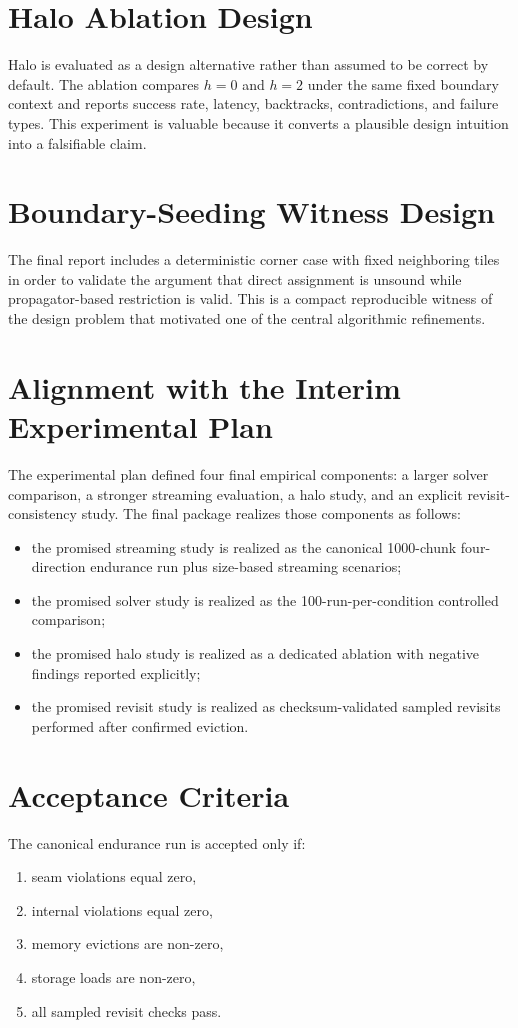 \documentclass[12pt,a4paper]{report}
\begin{document}
\section{Halo Ablation Design}
Halo is evaluated as a design alternative rather than assumed to be correct by default. The ablation compares $h=0$ and $h=2$ under the same fixed boundary context and reports success rate, latency, backtracks, contradictions, and failure types. This experiment is valuable because it converts a plausible design intuition into a falsifiable claim.

\section{Boundary-Seeding Witness Design}
The final report includes a deterministic corner case with fixed neighboring tiles in order to validate the argument that direct assignment is unsound while propagator-based restriction is valid. This is a compact reproducible witness of the design problem that motivated one of the central algorithmic refinements.

\section{Alignment with the Interim Experimental Plan}
The experimental plan defined four final empirical components: a larger solver comparison, a stronger streaming evaluation, a halo study, and an explicit revisit-consistency study. The final package realizes those components as follows:
\begin{itemize}
\item the promised streaming study is realized as the canonical 1000-chunk four-direction endurance run plus size-based streaming scenarios;
\item the promised solver study is realized as the 100-run-per-condition controlled comparison;
\item the promised halo study is realized as a dedicated ablation with negative findings reported explicitly;
\item the promised revisit study is realized as checksum-validated sampled revisits performed after confirmed eviction.
\end{itemize}

\section{Acceptance Criteria}
The canonical endurance run is accepted only if:
\begin{enumerate}
\item seam violations equal zero,
\item internal violations equal zero,
\item memory evictions are non-zero,
\item storage loads are non-zero,
\item all sampled revisit checks pass.
\end{enumerate}
\end{document}
